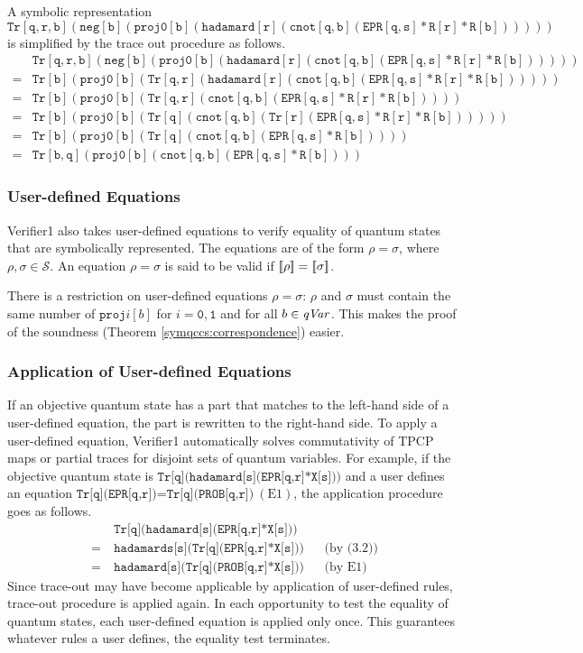 \begin{ex}
 A symbolic representation 
\[
\mathtt{Tr[q,r,b](neg[b](proj0[b](hadamard[r](cnot[q,b](EPR[q,s]*R[r]*R[b])))))}
\]
is simplified by the trace out procedure as follows.
\begin{align*}
&\mathtt{Tr[q,r,b](neg[b](proj0[b](hadamard[r](cnot[q,b](EPR[q,s]*R[r]*R[b])))))}\\
=&\mathtt{Tr[b](proj0[b](Tr[q,r](hadamard[r](cnot[q,b](EPR[q,s]*R[r]*R[b])))))}\\
=&\mathtt{Tr[b](proj0[b](Tr[q,r](cnot[q,b](EPR[q,s]*R[r]*R[b]))))}\\
=&\mathtt{Tr[b](proj0[b](Tr[q](cnot[q,b](Tr[r](EPR[q,s]*R[r]*R[b])))))}\\
=&\mathtt{Tr[b](proj0[b](Tr[q](cnot[q,b](EPR[q,s]*R[b]))))}\\
=&\mathtt{Tr[b,q](proj0[b](cnot[q,b](EPR[q,s]*R[b])))}
\end{align*}
\end{ex}

\subsubsection{User-defined Equations}
Verifier1 also takes user-defined equations to verify equality
of quantum states that are symbolically represented. The equations
are of the form $\rho = \sigma$, where $\rho, \sigma \in \mathcal{S}$.
An equation $\rho = \sigma$ is said to be valid if $[\![\rho]\!] =
[\![\sigma]\!]$.

There is a restriction on user-defined equations $\rho = \sigma$:
$\rho$ and $\sigma$ must contain the same number of
$\mathtt{proj}i[b]$ for $i = \mathtt{0}, \mathtt{1}$ and for all
$b \in \mathit{qVar}$. This makes the proof
of the soundness (Theorem \ref{symqccs:correspondence}) easier.

\subsubsection{Application of User-defined Equations}
If an objective quantum state has a part that
matches to the left-hand side of a user-defined equation,
the part is rewritten to the right-hand side.
To apply a user-defined equation, Verifier1 automatically
solves commutativity of TPCP maps or partial traces
for disjoint sets of quantum variables.
For example, if the objective quantum
state is $\texttt{Tr[q](hadamard[s]}\texttt{(EPR[q,r]*X[s]))}$ and a user
defines an equation $\texttt{Tr[q](EPR[q,r])=Tr[q](PROB[q,r])}~\mathrm{(E1)}$, 
the application procedure goes as follows.
\begin{align*}
&\texttt{Tr[q](hadamard[s](EPR[q,r]*X[s]))}\\
=~&\texttt{hadamards[s](Tr[q](EPR[q,r]*X[s]))} &&\mbox{(by (3.2))}\\
=~&\texttt{hadamard[s](Tr[q](PROB[q,r]*X[s]))} &&\mbox{(by E1)}
\end{align*}
Since trace-out may have become applicable by application of
user-defined rules, trace-out procedure is applied again.
In each opportunity to test the equality of quantum states, 
each user-defined equation is applied only once.
This guarantees whatever rules a user defines, the equality test
terminates.

